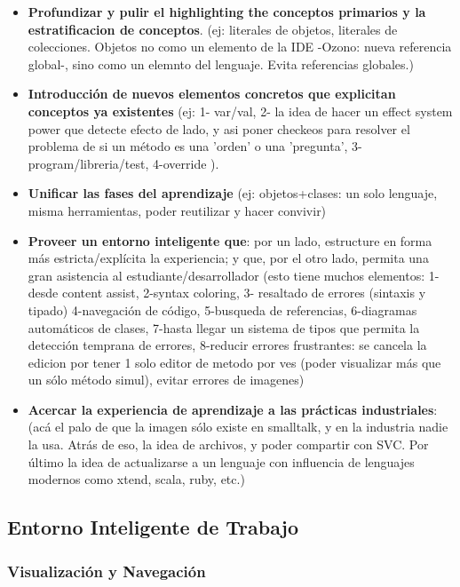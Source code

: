 \begin{itemize}
\item \textbf{Profundizar y pulir el highlighting the conceptos primarios y la
estratificacion de conceptos}.
	(ej: literales de objetos, literales de colecciones. Objetos no como un
	elemento de la IDE -Ozono: nueva referencia global-, sino como un elemnto del
	lenguaje. Evita referencias globales.)
\item \textbf{Introducción de nuevos elementos concretos que explicitan
conceptos ya existentes} (ej: 1- var/val, 2- la idea de hacer un effect system
power que detecte efecto de lado, y asi poner checkeos para resolver el problema de si un método es una 'orden' o una 'pregunta', 3- program/libreria/test, 4-override ).
\item \textbf{Unificar las fases del aprendizaje} (ej: objetos+clases: un solo
lenguaje, misma herramientas, poder reutilizar y hacer convivir)
\item \textbf{Proveer un entorno inteligente que}: por un lado, estructure en
forma más estricta/explícita la experiencia; y que, por el otro lado, permita una gran asistencia al estudiante/desarrollador (esto tiene muchos elementos: 1- desde content assist, 2-syntax coloring, 3- resaltado de errores (sintaxis y tipado) 4-navegación de código, 5-busqueda de referencias, 6-diagramas automáticos de clases, 7-hasta llegar un sistema de tipos que permita la detección temprana de errores, 8-reducir errores frustrantes: se cancela la edicion por tener 1 solo editor de metodo por ves (poder visualizar más que un sólo método simul), evitar errores de imagenes)
\item \textbf{Acercar la experiencia de aprendizaje a las prácticas
industriales}: (acá el palo de que la imagen sólo existe en smalltalk, y en la
industria nadie la usa. Atrás de eso, la idea de archivos, y poder compartir con SVC. Por último la idea de actualizarse a un lenguaje con influencia de lenguajes modernos como xtend, scala, ruby, etc.)
\end{itemize}

\subsection{Entorno Inteligente de Trabajo}
\label{subsec:proposedSolution-entornoInteligente}

\subsubsection{Visualización y Navegación}


